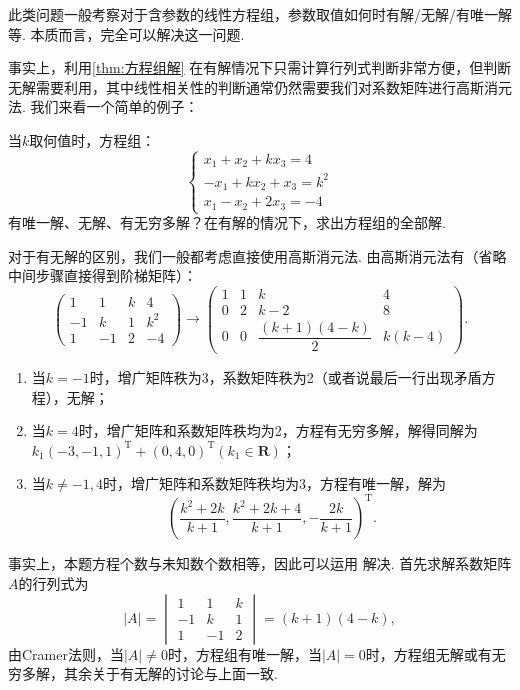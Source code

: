 此类问题一般考察对于含参数的线性方程组，参数取值如何时有解/无解/有唯一解等. 本质而言，完全可以解决这一问题.

事实上，利用\autoref{thm:方程组解} 在有解情况下只需计算行列式判断非常方便，但判断无解需要利用，其中线性相关性的判断通常仍然需要我们对系数矩阵进行高斯消元法. 我们来看一个简单的例子：
\begin{example}{}{}
    当$k$取何值时，方程组：
    \[\begin{cases}
            x_1+x_2+kx_3=4 \\ -x_1+kx_2+x_3=k^2 \\ x_1-x_2+2x_3=-4
        \end{cases}\]
    有唯一解、无解、有无穷多解？在有解的情况下，求出方程组的全部解.
\end{example}
\begin{solution}
    对于有无解的区别，我们一般都考虑直接使用高斯消元法. 由高斯消元法有（省略中间步骤直接得到阶梯矩阵）：
    \[\begin{pmatrix}
            1  & 1  & k & 4   \\
            -1 & k  & 1 & k^2 \\
            1  & -1 & 2 & -4
        \end{pmatrix}\to\begin{pmatrix}
            1 & 1 & k                     & 4      \\
            0 & 2 & k-2                   & 8      \\
            0 & 0 & \dfrac{(k+1)(4-k)}{2} & k(k-4)
        \end{pmatrix}.\]
    \begin{enumerate}
        \item 当$k=-1$时，增广矩阵秩为3，系数矩阵秩为2（或者说最后一行出现矛盾方程），无解；

        \item 当$k=4$时，增广矩阵和系数矩阵秩均为2，方程有无穷多解，解得同解为$k_1(-3,-1,1)^{\mathrm{T}}+(0,4,0)^{\mathrm{T}}(k_1\in\mathbf{R})$；

        \item 当$k\neq-1,4$时，增广矩阵和系数矩阵秩均为3，方程有唯一解，解为
              \[(\dfrac{k^2+2k}{k+1},\dfrac{k^2+2k+4}{k+1},-\dfrac{2k}{k+1})^{\mathrm{T}}.\]
    \end{enumerate}

    事实上，本题方程个数与未知数个数相等，因此可以运用 解决. 首先求解系数矩阵$A$的行列式为
    \[|A|=\begin{vmatrix}
            1  & 1  & k \\
            -1 & k  & 1 \\
            1  & -1 & 2
        \end{vmatrix}=(k+1)(4-k),\]
    由Cramer法则，当$|A|\neq 0$时，方程组有唯一解，当$|A|=0$时，方程组无解或有无穷多解，其余关于有无解的讨论与上面一致.
\end{solution}

